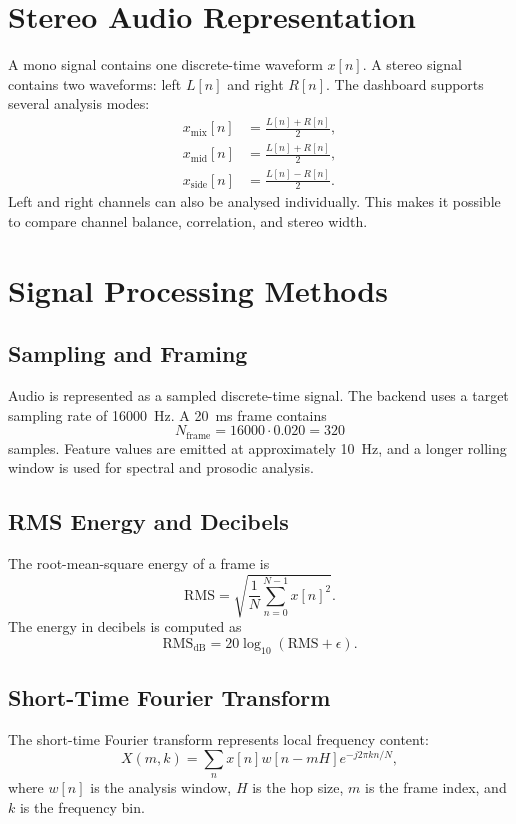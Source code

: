 \documentclass[11pt,a4paper]{article}
\begin{document}
\section{Stereo Audio Representation}
A mono signal contains one discrete-time waveform $x[n]$. A stereo signal contains two waveforms: left $L[n]$ and right $R[n]$. The dashboard supports several analysis modes:
\begin{align}
    x_{\text{mix}}[n] &= \frac{L[n] + R[n]}{2}, \\
    x_{\text{mid}}[n] &= \frac{L[n] + R[n]}{2}, \\
    x_{\text{side}}[n] &= \frac{L[n] - R[n]}{2}.
\end{align}
Left and right channels can also be analysed individually. This makes it possible to compare channel balance, correlation, and stereo width.

\section{Signal Processing Methods}

\subsection{Sampling and Framing}
Audio is represented as a sampled discrete-time signal. The backend uses a target sampling rate of \SI{16000}{Hz}. A \SI{20}{ms} frame contains
\begin{equation}
N_{\text{frame}} = 16000 \cdot 0.020 = 320
\end{equation}
samples. Feature values are emitted at approximately \SI{10}{Hz}, and a longer rolling window is used for spectral and prosodic analysis.

\subsection{RMS Energy and Decibels}
The root-mean-square energy of a frame is
\begin{equation}
\mathrm{RMS} = \sqrt{\frac{1}{N}\sum_{n=0}^{N-1} x[n]^2}.
\end{equation}
The energy in decibels is computed as
\begin{equation}
\mathrm{RMS}_{\mathrm{dB}} = 20\log_{10}(\mathrm{RMS}+\epsilon).
\end{equation}

\subsection{Short-Time Fourier Transform}
The short-time Fourier transform represents local frequency content:
\begin{equation}
X(m,k)=\sum_n x[n]w[n-mH]e^{-j2\pi kn/N},
\end{equation}
where $w[n]$ is the analysis window, $H$ is the hop size, $m$ is the frame index, and $k$ is the frequency bin.
\end{document}
